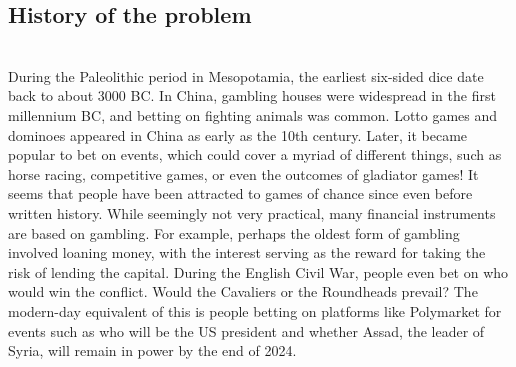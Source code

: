 \documentclass{article}
\begin{document}
\subsection{History of the problem} 
\\[-10pt]
During the Paleolithic period in Mesopotamia, the \newline
earliest six-sided dice date back to about 3000 BC. \newline 
In China, gambling houses were widespread in the \newline
first millennium BC, and betting on fighting \newline
animals was common. Lotto games and dominoes \newline
appeared in China as early as the 10th century.\newline
\newline
Later, it became popular to bet on events, which could cover a myriad of different things, such as horse racing, competitive games, or even the outcomes of gladiator games! It seems that people have been attracted to games of chance since even before written history. While seemingly not very practical, many financial instruments are based on gambling. For example, perhaps the oldest form of gambling involved loaning money, with the interest serving as the reward for taking the risk of lending the capital.\newline
\newline
During the English Civil War, people even bet on who would win the conflict. Would the Cavaliers or the \newline
Roundheads prevail? The modern-day equivalent of this is people betting on platforms like Polymarket for \newline events such as who will be the US president and whether Assad, the leader of Syria, will remain in power by \newline the end of 2024.
\vspace{10mm}
\end{document}
